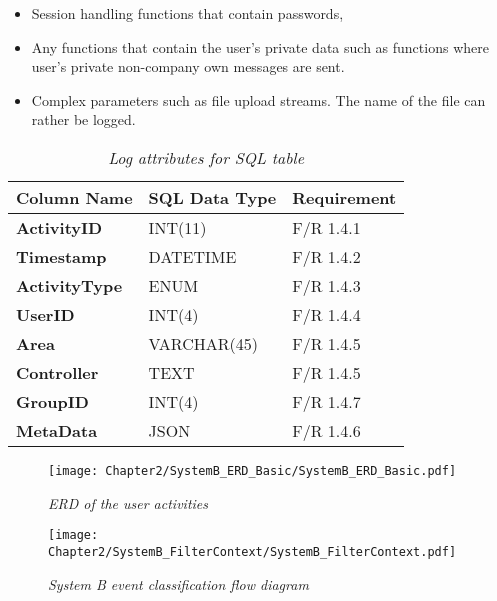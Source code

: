 \begin{itemize}
	\item Session handling functions that contain passwords,
	\item Any functions that contain the user's private data such as functions where user's private non-company own messages are sent.
	\item Complex parameters such as file upload streams. The name of the file can rather be logged.
\end{itemize}



\begin{table}[!htb]
	\centering
	\caption[Log attributes for SQL table]
	{\textit{Log attributes for SQL table}}
	\label{tbl:ch2_SQLLoggingTable}
	\begin{tabularx}{\textwidth}{|X|X|X|}
		\hline \textbf{Column Name} & \textbf{SQL Data Type} & \textbf{Requirement} \\
		\hline \textbf{ActivityID} & INT(11) & F/R 1.4.1 \\
		\hline \textbf{Timestamp} & DATETIME & F/R 1.4.2 \\
		\hline \textbf{ActivityType} & ENUM & F/R 1.4.3 \\
		\hline \textbf{UserID} & INT(4) & F/R 1.4.4 \\
		\hline \textbf{Area} & VARCHAR(45) & F/R 1.4.5 \\
		\hline \textbf{Controller} & TEXT & F/R 1.4.5 \\
		\hline \textbf{GroupID} & INT(4) & F/R 1.4.7 \\
		\hline \textbf{MetaData} & JSON & F/R 1.4.6 \\
		\hline
	\end{tabularx}
\end{table}

\begin{figure}[!htb] %
	\centering %
	\texttt{[image: Chapter2/SystemB\_ERD\_Basic/SystemB\_ERD\_Basic.pdf]}
	\caption[ERD of user activities]
	{\textit{ERD of the user activities}}\label{fig:ch2_erdOfEventLogs}
\end{figure}



\begin{figure}[!htb]
	\centering
	\texttt{[image: Chapter2/SystemB\_FilterContext/SystemB\_FilterContext.pdf]}
	\caption[System B event classification]
	{\textit{System B event classification flow diagram}}\label{fig:ch2_loggingParse}
\end{figure}

